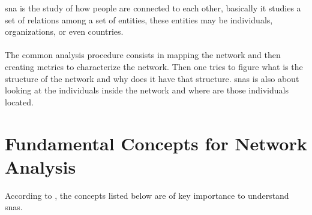 \acrfull{sna} is the study of how people are connected to each other, basically it studies a set of relations among a set of entities,
these entities may be individuals, organizations, or even countries.\\\\
\indent The common analysis procedure consists in mapping the network and then creating metrics to
characterize the network. Then one tries to figure what is the structure of the network and why does
it have that structure. \glspl{sna} is also about looking at the individuals inside the network and where are those individuals located.

\section{Fundamental Concepts for Network Analysis}

According to \cite{wasserman1994social}, the concepts listed below are of key importance to understand \glspl{sna}.

